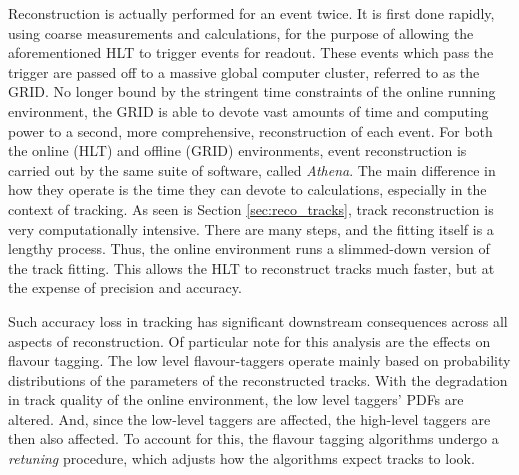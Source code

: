         Reconstruction is actually performed for an event twice.
        It is first done rapidly, using coarse measurements and calculations,
            for the purpose of allowing the aforementioned HLT to trigger events for readout.
        These events which pass the trigger are passed off to a massive global computer cluster, referred to as the GRID.
        No longer bound by the stringent time constraints of the online running environment,
            the GRID is able to devote vast amounts of time and computing power to a second, 
            more comprehensive, reconstruction of each event.
        For both the online (HLT) and offline (GRID) environments, event reconstruction is carried out by the same suite of software,
            called \textit{Athena}.
        The main difference in how they operate is the time they can devote to calculations, especially in the context of tracking.
        As seen is Section \ref{sec:reco_tracks}, track reconstruction is very computationally intensive.
        There are many steps, and the fitting itself is a lengthy process.
        Thus, the online environment runs a slimmed-down version of the track fitting.
        This allows the HLT to reconstruct tracks much faster, but at the expense of precision and accuracy.

        Such accuracy loss in tracking has significant downstream consequences across all aspects of reconstruction.
        Of particular note for this analysis are the effects on flavour tagging.
        The low level flavour-taggers operate mainly based on probability distributions of the parameters of the reconstructed tracks.
        With the degradation in track quality of the online environment, the low level taggers' PDFs are altered.
        And, since the low-level taggers are affected, the high-level taggers are then also affected.
        To account for this, the flavour tagging algorithms undergo a \textit{retuning} procedure, 
            which adjusts how the algorithms expect tracks to look.

